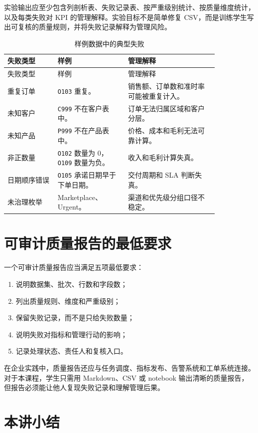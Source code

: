 \documentclass[UTF8,fontset=fandol,openany,zihao=-4]{ctexbook}
\begin{document}
实验输出应至少包含列剖析表、失败记录表、按严重级别统计、按质量维度统计，以及每类失败对 KPI 的管理解释。实验目标不是简单修复 CSV，而是训练学生写出可复核的质量规则，并将失败记录解释为管理风险。

\begin{longtable}{>{\raggedright\arraybackslash}p{0.20\linewidth}>{\raggedright\arraybackslash}p{0.28\linewidth}>{\raggedright\arraybackslash}p{0.36\linewidth}}
\caption{样例数据中的典型失败}\\
\toprule
失败类型 & 样例 & 管理解释\\
\midrule
\endfirsthead
\toprule
失败类型 & 样例 & 管理解释\\
\midrule
\endhead
重复订单 & \texttt{O103} 重复。 & 销售额、订单数和准时率可能被重复计入。\\
未知客户 & \texttt{C999} 不在客户表中。 & 订单无法归属区域和客户分层。\\
未知产品 & \texttt{P999} 不在产品表中。 & 价格、成本和毛利无法可靠计算。\\
非正数量 & \texttt{O102} 数量为 0，\texttt{O109} 数量为负。 & 收入和毛利计算失真。\\
日期顺序错误 & \texttt{O105} 承诺日期早于下单日期。 & 交付周期和 SLA 判断失真。\\
未治理枚举 & Marketplace、Urgent。 & 渠道和优先级分组口径不稳定。\\
\bottomrule
\end{longtable}

\section{可审计质量报告的最低要求}

一个可审计质量报告应当满足五项最低要求：
\begin{enumerate}
  \item 说明数据集、批次、行数和字段数；
  \item 列出质量规则、维度和严重级别；
  \item 保留失败记录，而不是只给失败数量；
  \item 说明失败对指标和管理行动的影响；
  \item 记录处理状态、责任人和复核入口。
\end{enumerate}

在企业实践中，质量报告还应与任务调度、指标发布、告警系统和工单系统连接。对于本课程，学生只需用 Markdown、CSV 或 notebook 输出清晰的质量报告，但报告必须能让他人复现失败记录和理解管理后果。

\section*{本讲小结}
\end{document}
